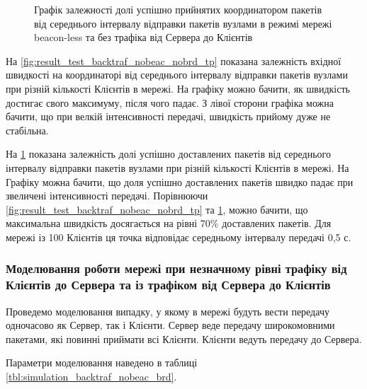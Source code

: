 \documentclass[a4paper,ukrainian,utf8,nocolumnsxix,floatsection,equationsection]{eskdtext}
\newcommand{\longcaption}[1]{\captionsetup{style=figureLongCaption}\caption{#1}}
\renewcommand\paragraph{\subsubsection}
\newcommand{\blm}[0]{beacon-less\xspace}
\begin{document}
\begin{figure}[htbp]
	\centering
	\longcaption{\label{fig:result_test_backtraf_nobeac_nobrd_succ_rate}Графік залежності долі успішно прийнятих координатором пакетів від середнього інтервалу відправки пакетів вузлами в режимі мережі \blm та без трафіка від Сервера до Клієнтів}
\end{figure}

На \cref{fig:result_test_backtraf_nobeac_nobrd_tp} показана залежність вхідної швидкості на координаторі від середнього інтервалу відправки пакетів вузлами при різній кількості Клієнтів в мережі. На графіку можно бачити, як швидкість достигає свого максимуму, після чого падає. З лівої сторони графіка можна бачити, що при велкій інтенсивності передачі, швидкість прийому дуже не стабільна.

На \cref{fig:result_test_backtraf_nobeac_nobrd_succ_rate} показана залежність долі успішно доставлених пакетів від середнього інтервалу відправки пакетів вузлами при різній кількості Клієнтів в мережі. На Графіку можна бачити, що доля успішно доставлених пакетів швидко падає при звеличені інтенсивності передачі. Порівнюючи \cref{fig:result_test_backtraf_nobeac_nobrd_tp} та \cref{fig:result_test_backtraf_nobeac_nobrd_succ_rate}, можно бачити, що максимальна швидкість досягається на рівні 70\% доставлених пакетів. Для мережі із 100 Клієнтів ця точка відповідає середньому інтервалу передачі 0,5 с.

\paragraph{Моделювання роботи мережі при незначному рівні трафіку від Клієнтів до Сервера та із трафіком від Сервера до Клієнтів}

Проведемо моделювання випадку, у якому в мережі будуть вести передачу одночасово як Сервер, так і Клієнти. Сервер веде передачу широкомовними пакетами, які повинні приймати всі Клієнти. Клієнти ведуть передачу до Сервера.

Параметри моделювання наведено в таблиці \ref{tbl:simulation_backtraf_nobeac_brd}.
\end{document}
